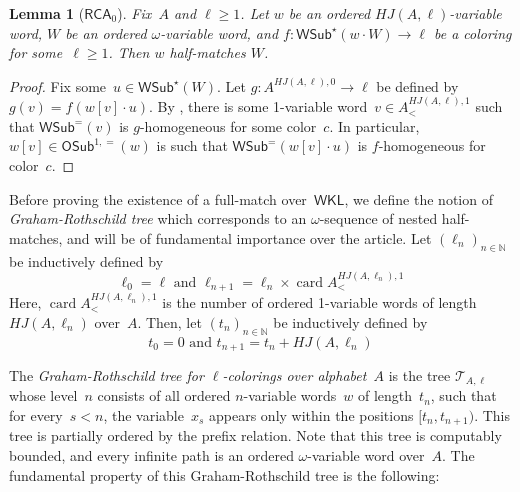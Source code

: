 \documentclass{article}
\def\T{\mathcal{T}}
\newcommand{\RCA}[0]{\mathsf{RCA}}
\newcommand{\WKL}[0]{\mathsf{WKL}}
\newcommand{\NN}[0]{\mathbb{N}}
\newcommand{\card}{\operatorname{card}} %
\newcommand{\OSub}{\mathsf{OSub}}
\newcommand{\WSub}{\mathsf{WSub}}
\numberwithin{theorem}{section}
\newtheorem{lemma}[theorem]{Lemma}
\theoremstyle{definition}
\begin{document}
\begin{lemma}[$\RCA_0$]
Fix~$A$ and $\ell \geq 1$.
Let $w$ be an ordered $HJ(A, \ell)$-variable word, $W$ be an ordered $\omega$-variable word,
and $f : \WSub^{\star}(w \cdot W) \to \ell$ be a coloring for some~$\ell \geq 1$.
Then $w$ half-matches $W$.
\end{lemma}
\begin{proof}
Fix some~$u \in \WSub^{\star}(W)$. Let $g : A^{HJ(A, \ell),0} \to \ell$ be defined by $g(v) = f(w[v] \cdot u)$.
By , there is some 1-variable word~$v \in A^{HJ(A,\ell),1}_{<}$ such that $\WSub^{=}(v)$ is $g$-homogeneous for some color~$c$. In particular, $w[v] \in \OSub^{1,=}(w)$ is such that $\WSub^{=}(w[v] \cdot u)$ is $f$-homogeneous for color~$c$.
\end{proof}

Before proving the existence of a full-match over~$\WKL$, we define the notion of \emph{Graham-Rothschild tree} which corresponds to an $\omega$-sequence of nested half-matches, and will be of fundamental importance over the article.
Let $(\ell_n)_{n \in \NN}$ be inductively defined by
$$\ell_0 = \ell \mbox{ and } \ell_{n+1} = \ell_n \times \card A^{HJ(A, \ell_n),1}_<$$
Here, $\card A^{HJ(A, \ell_n),1}_<$ is the number of ordered 1-variable words of length $HJ(A, \ell_n)$ over~$A$. Then, let $(t_n)_{n \in \NN}$ be inductively defined by
$$t_0 = 0 \mbox{ and } t_{n+1} = t_n + HJ(A, \ell_n)$$

The \emph{Graham-Rothschild tree for $\ell$-colorings over alphabet~$A$} is the tree $\T_{A,\ell}$ whose level~$n$ consists of all ordered $n$-variable words~$w$ of length~$t_n$, such that for every~$s < n$, the variable~$x_s$ appears only within the positions $[t_n, t_{n+1})$. This tree is partially ordered by the prefix relation. Note that this tree is computably bounded, and every infinite path is an ordered $\omega$-variable word over~$A$. The fundamental property of this Graham-Rothschild tree is the following:
\end{document}
